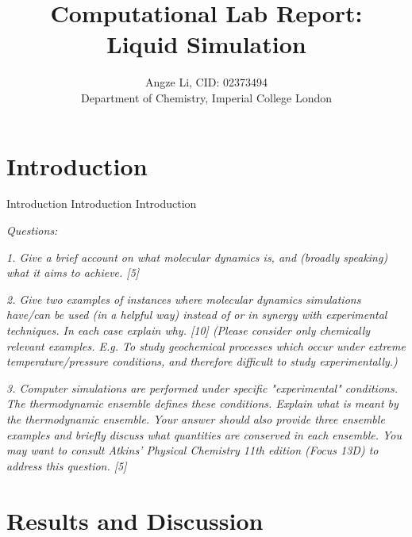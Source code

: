 \documentclass[a4paper,10pt,twocolumn]{article}
\title{\textbf{Computational Lab Report: \\
Liquid Simulation}}
\author{Angze Li, CID: 02373494 \\
    Department of Chemistry, Imperial College London}
\begin{document}
\maketitle

\noindent
{}

\vspace{1em}

\section{Introduction}  %

Introduction Introduction Introduction

\textit{Questions:}

\textit{1. Give a brief account on what molecular dynamics is, and (broadly speaking) what it aims to achieve. [5]}

\textit{2. Give two examples of instances where molecular dynamics simulations have/can be used (in a helpful way) instead of or in synergy with experimental techniques. In each case explain why. [10] (Please consider only chemically relevant examples. E.g. To study
geochemical processes which occur under extreme temperature/pressure conditions, and therefore difficult to study experimentally.)}

\textit{3. Computer simulations are performed under specific "experimental" conditions. The thermodynamic ensemble defines these conditions. Explain what is meant by the thermodynamic ensemble. Your answer should also provide three ensemble examples and briefly discuss what quantities are conserved in each ensemble. You may want to consult
Atkins' Physical Chemistry 11th edition (Focus 13D) to address this question. [5]}

\section{Results and Discussion} %
\end{document}
